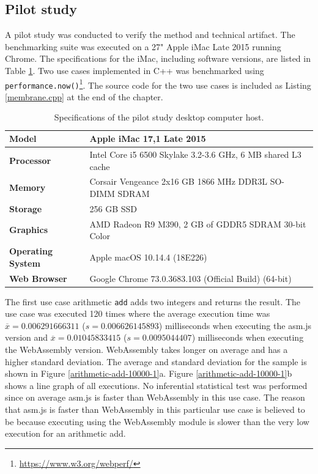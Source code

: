 
\clearpage

\subsection{Pilot study}

A pilot study was conducted to verify the method and technical artifact. The benchmarking suite was executed on a 27" Apple iMac Late 2015 running Chrome. The specifications for the iMac, including software versions, are listed in Table \ref{specifications}. Two use cases implemented in C++ was benchmarked using \texttt{performance.now()}\footnote{\url{https://www.w3.org/webperf/}}. The source code for the two use cases is included as Listing \ref{membrane.cpp} at the end of the chapter.

\begin{table}[!h]
\caption{\label{specifications}Specifications of the pilot study desktop computer host.}
\centering
\begin{tabular}{ll}
\hline
\textbf{Model} & Apple iMac 17,1 Late 2015\\ \hline
\textbf{Processor} & Intel Core i5 6500 Skylake 3.2-3.6 GHz, 6 MB shared L3 cache \\
\textbf{Memory} & Corsair Vengeance 2x16 GB 1866 MHz DDR3L SO-DIMM SDRAM \\
\textbf{Storage} & 256 GB SSD \\
\textbf{Graphics} & AMD Radeon R9 M390, 2 GB of GDDR5 SDRAM 30-bit Color \\ \hline
\textbf{Operating System} & Apple macOS 10.14.4 (18E226) \\
\textbf{Web Browser} & Google Chrome 73.0.3683.103 (Official Build) (64-bit) \\ \hline
\end{tabular}
\end{table}

The first use case arithmetic \texttt{add} adds two integers and returns the result. The use case was executed 120 times where the average execution time was $\overline{x}=0.006291666311$ ($s=0.006626145893$) milliseconds when executing the asm.js version and $\overline{x}=0.01045833415$ ($s=0.0095044407$) milliseconds when executing the WebAssembly version. WebAssembly takes longer on average and has a higher standard deviation. The average and standard deviation for the sample is shown in Figure \ref{arithmetic-add-10000-1}a. Figure \ref{arithmetic-add-10000-1}b shows a line graph of all executions. No inferential statistical test was performed since on average asm.js is faster than WebAssembly in this use case. The reason that asm.js is faster than WebAssembly in this particular use case is believed to be because executing using the WebAssembly module is slower than the very low execution for an arithmetic add.

